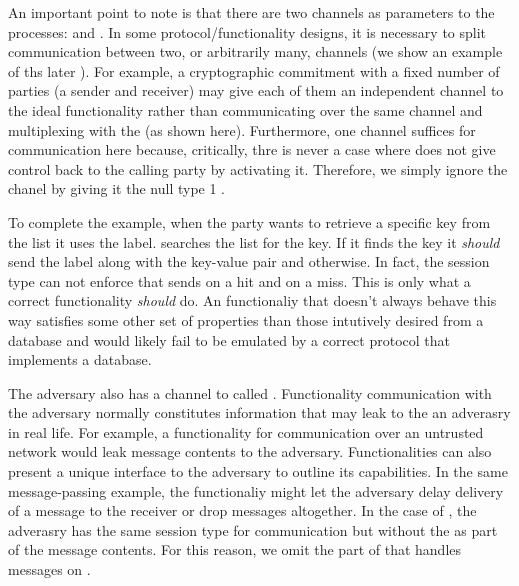 An important point to note is that there are two channels as parameters to the processes:  and . 
In some protocol/functionality designs, it is necessary to split communication between two, or arbitrarily many, channels (we show an example of ths later ). 
For example, a cryptographic commitment with a fixed number of parties (a sender and receiver) may give each of them an independent channel to the ideal functionality rather than communicating over the same channel and multiplexing with the  (as shown here).
Furthermore, one channel suffices for communication here because, critically, thre is never a case where \Fdb does not give control back to the calling party by activating it. 
Therefore, we simply ignore the  chanel by giving it the null type 1 .

To complete the example, when the party wants to retrieve a specific key from the list it uses the  label. \Fdb searches the list for the key. 
If it finds the key it \emph{should} send the label  along with the key-value pair and  otherwise.
In fact, the session type can not enforce that \Fdb sends  on a hit and  on a miss. This is only what a correct functionality \emph{should} do. 
An functionaliy that doesn't always behave this way satisfies some other set of properties than those intutively desired from a database and would likely fail to be emulated by a correct protocol that implements a database.

The adversary also has a channel to \Fdb called . 
Functionality communication with the adversary normally constitutes information that may leak to the an adverasry in real life. For example, a functionality for communication over an untrusted network would leak message contents to the adversary. 
Functionalities can also present a unique interface to the adversary to outline its capabilities. In the same message-passing example, the functionaliy might let the adversary delay delivery of a message to the receiver or drop messages altogether. 
In the case of \Fdb, the adverasry has the same session type for communication but without the  as part of the message contents. 
For this reason, we omit the part of \Fdb that handles messages on .



